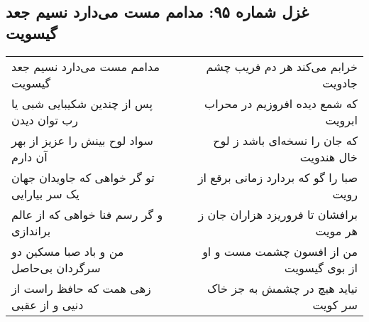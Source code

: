 \begin{center}
\section*{غزل شماره ۹۵: مدامم مست می‌دارد نسیم جعد گیسویت}
\label{sec:sh095}
\begin{longtable}{l p{0.5cm} r}
مدامم مست می‌دارد نسیم جعد گیسویت
&&
خرابم می‌کند هر دم فریب چشم جادویت
\\
پس از چندین شکیبایی شبی یا رب توان دیدن
&&
که شمع دیده افروزیم در محراب ابرویت
\\
سواد لوح بینش را عزیز از بهر آن دارم
&&
که جان را نسخه‌ای باشد ز لوح خال هندویت
\\
تو گر خواهی که جاویدان جهان یک سر بیارایی
&&
صبا را گو که بردارد زمانی برقع از رویت
\\
و گر رسم فنا خواهی که از عالم براندازی
&&
برافشان تا فروریزد هزاران جان ز هر مویت
\\
من و باد صبا مسکین دو سرگردان بی‌حاصل
&&
من از افسون چشمت مست و او از بوی گیسویت
\\
زهی همت که حافظ راست از دنیی و از عقبی
&&
نیاید هیچ در چشمش به جز خاک سر کویت
\\
\end{longtable}
\end{center}
